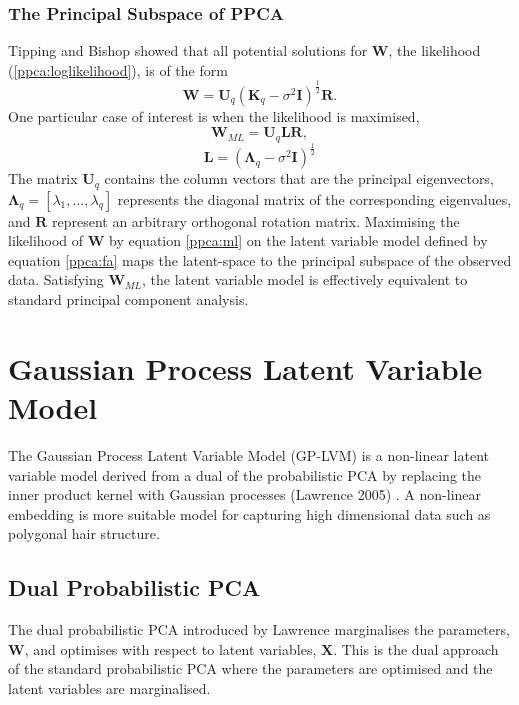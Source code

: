 \documentclass[ %
author={Dillon Keith Diep},
supervisor={Dr. Carl Henrik Ek},
degree={MEng},
title={ART-CG:},
subtitle={Assisted Real-time Content Generation of 3D Hair by Learning Manifolds},
type={Research},
year={2017} ]{dissertation}
\begin{document}
\subsubsection{The Principal Subspace of PPCA}
Tipping and Bishop showed that all potential solutions for $\bm{W}$, the likelihood (\ref{ppca:loglikelihood}), is of the form \cite{ppca} $$\bm{W}=\bm{U}_q(\bm{K}_q-\sigma^2\bm{I})^\frac{1}{2}\bm{R}.$$
One particular case of interest is when the likelihood is maximised,
\begin{equation} \label{ppca:ml}
\bm{W}_{ML}=\bm{U}_q\bm{LR},
\end{equation}
$$\bm{L}=(\bm{\Lambda}_q-\sigma^2\bm{I})^{\frac{1}{2}}$$
The matrix $\bm{U}_q$ contains the column vectors that are the principal eigenvectors, $\bm{\Lambda}_q=[\lambda_1,...,\lambda_q]$ represents the diagonal matrix of the corresponding eigenvalues, and $\bm{R}$ represent an arbitrary orthogonal rotation matrix. 
Maximising the likelihood of $\bm{W}$ by equation \ref{ppca:ml} on the latent variable model defined by equation \ref{ppca:fa} maps the latent-space to the principal subspace of the observed data. Satisfying $\bm{W}_{ML}$, the latent variable model is effectively equivalent to standard principal component analysis.

\section{Gaussian Process Latent Variable Model}
The Gaussian Process Latent Variable Model (GP-LVM) is a non-linear latent variable model derived from a dual of the probabilistic PCA by replacing the inner product kernel with Gaussian processes (Lawrence 2005) \cite{gplvm}. A non-linear embedding is more suitable model for capturing high dimensional data such as polygonal hair structure.
	
\subsection{Dual Probabilistic PCA}
The dual probabilistic PCA introduced by Lawrence marginalises the parameters, $\bm{W}$, and optimises with respect to latent variables, $\bm{X}$. This is the dual approach of the standard probabilistic PCA where the parameters are optimised and the latent variables are marginalised.
\end{document}

